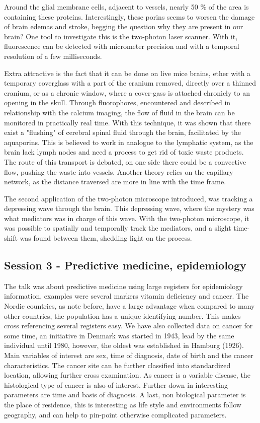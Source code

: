 \documentclass[12p]{article}
\begin{document}
Around the glial membrane cells, adjacent to vessels, nearly 50 \% of the area is containing these proteins.
Interestingly, these porins seems to worsen the damage of brain edemas and stroke, begging the question why they are present in our brain?
One tool to investigate this is the two-photon laser scanner.
With it, fluorescence can be detected with micrometer precision and with a temporal resolution of a few milliseconds.

Extra attractive is the fact that it can be done on live mice brains, ether with a temporary coverglass with a part of the cranium removed, directly over a thinned cranium, or as a chronic window, where a cover-gass is attached chronicly to an opening in the skull.
Through fluorophores, encountered and described in relationship with the calcium imaging, the flow of fluid in the brain can be monitored in practically real time.
With this technique, it was shown that there exist a "flushing" of cerebral spinal fluid through the brain, facilitated by the aquaporins.
This is believed to work in analogue to the lymphatic system, as the brain lack lymph nodes and need a process to get rid of toxic waste products.
The route of this transport is debated, on one side there could be a convective flow, pushing the waste into vessels.
Another theory relies on the capillary network, as the distance traversed are more in line with the time frame.

The second application of the two-photon microscope introduced, was tracking a depressing wave through the brain.
This depressing wave, where the mystery was what mediators was in charge of this wave.
With the two-photon microscope, it was possible to spatially and temporally track the mediators, and a slight time-shift was found between them, shedding light on the process.

\subsection*{Session 3 - Predictive medicine, epidemiology}

The talk was about predictive medicine using large registers for epidemiology information, examples were several markers vitamin deficiency and cancer.
The Nordic countries, as note before, have a large advantage when compared to many other countries, the population has a unique identifying number.
This makes cross referencing several registers easy.
We have also collected data on cancer for some time, an initiative in Denmark was started in 1943, lead by the same individual until 1980, however, the oldest was established in Hamburg (1926).
Main variables of interest are sex, time of diagnosis, date of birth and the cancer characteristics.
The cancer site can be further classified into standardized location, allowing further cross examination.
As cancer is a variable disease, the histological type of cancer is also of interest.
Further down in interesting parameters are time and basis of diagnosis.
A last, non biological parameter is the place of residence, this is interesting as life style and environments follow geography, and can help to pin-point otherwise complicated parameters.
\end{document}
